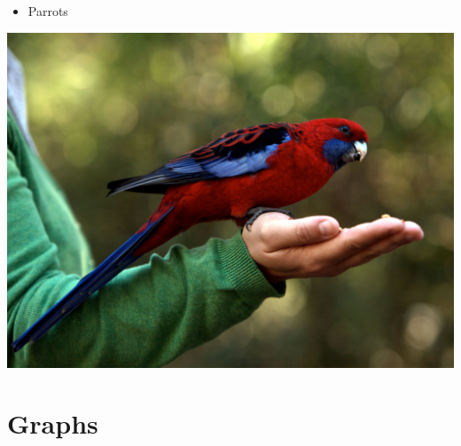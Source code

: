 \documentclass{beamer}\usepackage[]{graphicx}\usepackage[]{xcolor}
\begin{document}
\begin{frame}
\begin{itemize}
		\item Parrots
\end{itemize}
\includegraphics[scale=0.7]{parrots.png}

\end{frame}

\section{Graphs}
\end{document}

